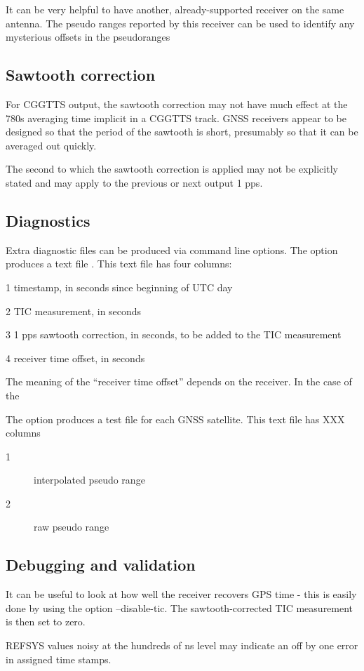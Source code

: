 It can be very helpful to have another, already-supported receiver on the same antenna. The pseudo ranges reported 
by this receiver can be used to identify any mysterious offsets in the pseudoranges 

\subsection{Sawtooth correction}

For CGGTTS output, the sawtooth correction may not have much effect at the 780s averaging
time implicit in a CGGTTS track. GNSS receivers appear to be designed so that the period of the sawtooth is
short, presumably so that it can be averaged out quickly.

The second to which the sawtooth correction is applied may not be explicitly stated and may apply to the previous
or next output 1 pps.

\subsection{Diagnostics}

Extra diagnostic files can be produced via command line options.
The option  produces a text file . This text file has four columns:
	\begin{description*}
	\item[1] timestamp, in seconds since beginning of UTC day
	\item[2] TIC measurement, in seconds
	\item[3] 1 pps sawtooth correction, in seconds, to be added to the TIC measurement
	\item[4] receiver time offset, in seconds
	\end{description*}

The meaning of the ``receiver time offset'' depends on the receiver. In the case of the 

The option  produces a test file  for each GNSS satellite. This text file has
XXX columns
	\begin{description}
	\item[1] interpolated pseudo range
	\item[2] raw pseudo range
	\end{description}
	
\subsection{Debugging and validation}

It can be useful to look at how well the receiver recovers GPS time - this is easily done by
using the option --disable-tic. The sawtooth-corrected TIC measurement is then set to zero.

REFSYS values noisy at the hundreds of ns level may indicate an off by one error in assigned time stamps.

